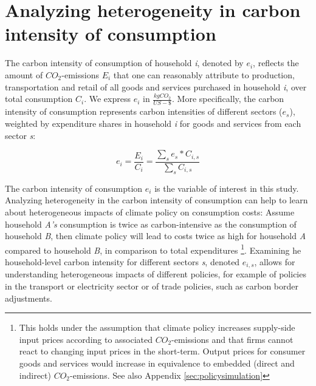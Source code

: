 \documentclass[12pt, a4paper]{article}
\begin{document}
\section{Analyzing heterogeneity in carbon intensity of consumption} \label{sec:methods}


The carbon intensity of consumption of household \textit{i}, denoted by $e_{i}$, reflects the amount of $CO_{2}$-emissions $E_{i}$ that one can reasonably attribute to production, transportation and retail of all goods and services purchased in household \textit{i}, over total consumption $C_{i}$. We express $e_{i}$ in $\frac{kgCO_{2}}{US-\$}$. More specifically, the carbon intensity of consumption represents carbon intensities of different sectors ($e_{s}$), weighted by expenditure shares in household \textit{i} for goods and services from each sector \textit{s}:


\begin{equation} \label{eq:Ci}
e_{i} = \frac{E_{i}}{C_{i}} = \frac{\sum_{s} e_{s}*C_{i,s}}{\sum_{s} C_{i,s}}
\end{equation}


The carbon intensity of consumption $e_{i}$ is the variable of interest in this study. Analyzing heterogeneity in the carbon intensity of consumption can help to learn about heterogeneous impacts of climate policy on consumption costs: Assume household \textit{A's} consumption is twice as carbon-intensive as the consumption of household \textit{B}, then climate policy will lead to costs twice as high for household \textit{A} compared to household \textit{B}, in comparison to total expenditures \footnote{This holds under the assumption that climate policy increases supply-side input prices according to associated $CO_{2}$-emissions and that firms cannot react to changing input prices in the short-term. Output prices for consumer goods and services would increase in equivalence to embedded (direct and indirect) $CO_{2}$-emissions. See also Appendix \ref{sec:policysimulation}}. Examining he household-level carbon intensity for different sectors \textit{s}, denoted $e_{i,s}$, allows for understanding heterogeneous impacts of different policies, for example of policies in the transport or electricity sector or of trade policies, such as carbon border adjustments.
\end{document}
